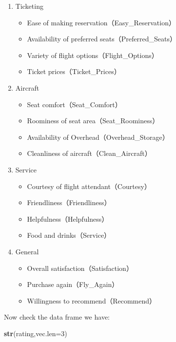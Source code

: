 \documentclass[12pt,]{krantz}
\newenvironment{Shaded}{\begin{snugshade}}{\end{snugshade}}
\newcommand{\KeywordTok}[1]{\textcolor[rgb]{0.13,0.29,0.53}{\textbf{{#1}}}}
\newcommand{\DataTypeTok}[1]{\textcolor[rgb]{0.13,0.29,0.53}{{#1}}}
\newcommand{\DecValTok}[1]{\textcolor[rgb]{0.00,0.00,0.81}{{#1}}}
\newcommand{\NormalTok}[1]{{#1}}
\providecommand{\tightlist}{%
  \setlength{\itemsep}{0pt}\setlength{\parskip}{0pt}}
\theoremstyle{definition}
\theoremstyle{definition}
\theoremstyle{remark}
\begin{document}
\begin{enumerate}
\def\labelenumi{\arabic{enumi}.}
\tightlist
\item
  Ticketing

  \begin{itemize}
  \tightlist
  \item
    Ease of making reservation（Easy\_Reservation）
  \item
    Availability of preferred seats（Preferred\_Seats）
  \item
    Variety of flight options（Flight\_Options）
  \item
    Ticket prices（Ticket\_Prices）
  \end{itemize}
\item
  Aircraft

  \begin{itemize}
  \tightlist
  \item
    Seat comfort（Seat\_Comfort）
  \item
    Roominess of seat area（Seat\_Roominess）
  \item
    Availability of Overhead（Overhead\_Storage）
  \item
    Cleanliness of aircraft（Clean\_Aircraft）
  \end{itemize}
\item
  Service

  \begin{itemize}
  \tightlist
  \item
    Courtesy of flight attendant（Courtesy）
  \item
    Friendliness（Friendliness）
  \item
    Helpfulness（Helpfulness）
  \item
    Food and drinks（Service）
  \end{itemize}
\item
  General

  \begin{itemize}
  \tightlist
  \item
    Overall satisfaction（Satisfaction）
  \item
    Purchase again（Fly\_Again）
  \item
    Willingness to recommend（Recommend）
  \end{itemize}
\end{enumerate}

Now check the data frame we have:

\begin{Shaded}
\begin{Highlighting}[]
\KeywordTok{str}\NormalTok{(rating,}\DataTypeTok{vec.len=}\DecValTok{3}\NormalTok{)}
\end{Highlighting}
\end{Shaded}
\end{document}
